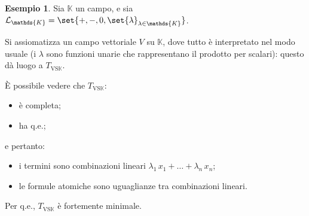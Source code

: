 \documentclass[10pt]{article}
\newcommand{\1}{\mathds{1}}
\newcommand{\K}{\mathds{K}}
\theoremstyle{definition}%
\newtheorem{esempio}[thm]{Esempio}
\theoremstyle{plain}
\theoremstyle{remark}
\begin{document}
\begin{esempio}
Sia \(\K\) un campo, e sia \(\mathcal{L}_{\K}=\set{+,-,0,\set{\lambda}_{\lambda \in \K}}\).

Si assiomatizza un campo vettoriale \(V\) su \(\K\), dove tutto è interpretato nel modo usuale (i \(\lambda\) sono funzioni unarie che rappresentano il prodotto per scalari): questo dà luogo a \(T_{\text{VS}\K}\).

È possibile vedere che \(T_{\text{VS}\K}\):
\begin{itemize}
\item è completa;
\item ha q.e.;
\end{itemize}
e pertanto:
\begin{itemize}
\item i termini sono combinazioni lineari \(\lambda_{1}\, x_{1}+\dots+\lambda_{n}\,x_{n}\);
\item le formule atomiche sono uguaglianze tra combinazioni lineari.
\end{itemize}

Per q.e., \(T_{\text{VS}\K}\) è fortemente minimale.
\end{esempio}
\end{document}

